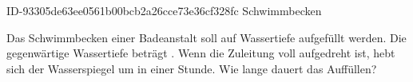 \begin{exercise}
      {ID-93305de63ee0561b00bcb2a26cce73e36cf328fc}
      {Schwimmbecken}
  \ifproblem\problem\par
    Das Schwimmbecken einer Badeanstalt soll auf  Wassertiefe aufgefüllt
    werden. Die gegenwärtige Wassertiefe beträgt . Wenn die Zuleitung
    voll aufgedreht ist, hebt sich der Wasserspiegel um  in einer Stunde.
    Wie lange dauert das Auffüllen?
  \fi
\end{exercise}
